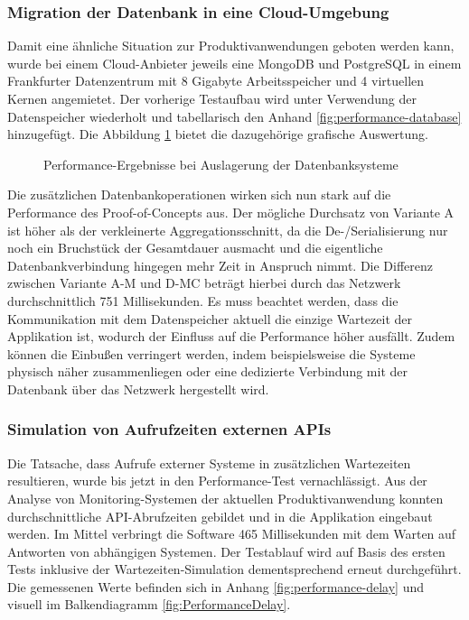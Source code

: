 \subsubsection{Migration der Datenbank in eine Cloud-Umgebung}

Damit eine ähnliche Situation zur Produktivanwendungen geboten werden kann, wurde bei einem Cloud-Anbieter jeweils eine MongoDB und PostgreSQL in einem Frankfurter Datenzentrum mit 8 Gigabyte Arbeitsspeicher und 4 virtuellen Kernen angemietet. Der vorherige Testaufbau wird unter Verwendung der Datenspeicher wiederholt und tabellarisch den Anhand \ref{fig:performance-database} hinzugefügt. Die Abbildung \ref{fig:PerformanceDatabase} bietet die dazugehörige grafische Auswertung.

\begin{figure}[htpb]
	\centering
	\footnotesize
	
	\caption{Performance-Ergebnisse bei Auslagerung der Datenbanksysteme}
	\label{fig:PerformanceDatabase}
\end{figure}

Die zusätzlichen Datenbankoperationen wirken sich nun stark auf die Performance des Proof-of-Concepts aus. Der mögliche Durchsatz von Variante A ist höher als der verkleinerte Aggregationsschnitt, da die De-/Serialisierung nur noch ein Bruchstück der Gesamtdauer ausmacht und die eigentliche Datenbankverbindung hingegen mehr Zeit in Anspruch nimmt. Die Differenz zwischen Variante A-M und D-MC beträgt hierbei durch das Netzwerk durchschnittlich 751 Millisekunden. Es muss beachtet werden, dass die Kommunikation mit dem Datenspeicher aktuell die einzige Wartezeit der Applikation ist, wodurch der Einfluss auf die Performance höher ausfällt. Zudem können die Einbußen verringert werden, indem beispielsweise die Systeme physisch näher zusammenliegen oder eine dedizierte Verbindung mit der Datenbank über das Netzwerk hergestellt wird.

\subsubsection{Simulation von Aufrufzeiten externen APIs}

Die Tatsache, dass Aufrufe externer Systeme in zusätzlichen Wartezeiten resultieren, wurde bis jetzt in den Performance-Test vernachlässigt. Aus der Analyse von Monitoring-Systemen der aktuellen Produktivanwendung konnten durchschnittliche API-Abrufzeiten gebildet und in die Applikation eingebaut werden. Im Mittel verbringt die Software 465 Millisekunden mit dem Warten auf Antworten von abhängigen Systemen. Der Testablauf wird auf Basis des ersten Tests inklusive der Wartezeiten-Simulation dementsprechend erneut durchgeführt. Die gemessenen Werte befinden sich in Anhang \ref{fig:performance-delay} und visuell im Balkendiagramm \ref{fig:PerformanceDelay}. 

